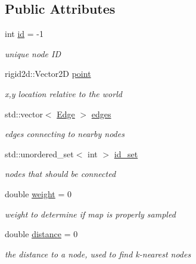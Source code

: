 \subsection*{Public Attributes}
\begin{DoxyCompactItemize}
\item 
\mbox{\label{structprm_1_1Node_a538d85b9f504bdb39268bd3168fd9211}} 
int \hyperlink{structprm_1_1Node_a538d85b9f504bdb39268bd3168fd9211}{id} = -\/1
\begin{DoxyCompactList}\small\item\em unique node ID \end{DoxyCompactList}\item 
\mbox{\label{structprm_1_1Node_afcf2b1941863d8d9a60874a30b9d2938}} 
rigid2d\+::\+Vector2D \hyperlink{structprm_1_1Node_afcf2b1941863d8d9a60874a30b9d2938}{point}
\begin{DoxyCompactList}\small\item\em x,y location relative to the world \end{DoxyCompactList}\item 
\mbox{\label{structprm_1_1Node_abf983b6e36e98f9caf0766b1e8c5500a}} 
std\+::vector$<$ \hyperlink{structprm_1_1Edge}{Edge} $>$ \hyperlink{structprm_1_1Node_abf983b6e36e98f9caf0766b1e8c5500a}{edges}
\begin{DoxyCompactList}\small\item\em edges connecting to nearby nodes \end{DoxyCompactList}\item 
\mbox{\label{structprm_1_1Node_a23d5570a4b85f7403399444e68d5aa52}} 
std\+::unordered\+\_\+set$<$ int $>$ \hyperlink{structprm_1_1Node_a23d5570a4b85f7403399444e68d5aa52}{id\+\_\+set}
\begin{DoxyCompactList}\small\item\em nodes that should be connected \end{DoxyCompactList}\item 
\mbox{\label{structprm_1_1Node_af137867e3fb1f9b0d3e43ef3fd8ddecd}} 
double \hyperlink{structprm_1_1Node_af137867e3fb1f9b0d3e43ef3fd8ddecd}{weight} = 0
\begin{DoxyCompactList}\small\item\em weight to determine if map is properly sampled \end{DoxyCompactList}\item 
\mbox{\label{structprm_1_1Node_a4db5966bcf026eaa4f2cd07ea22bcb4f}} 
double \hyperlink{structprm_1_1Node_a4db5966bcf026eaa4f2cd07ea22bcb4f}{distance} = 0
\begin{DoxyCompactList}\small\item\em the distance to a node, used to find k-\/nearest nodes \end{DoxyCompactList}\end{DoxyCompactItemize}


